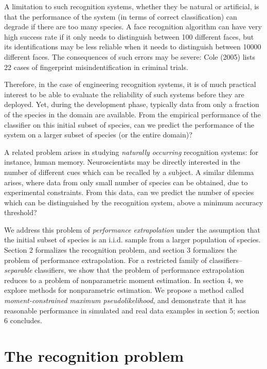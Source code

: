 \documentclass{article}
\begin{document}
A limitation to such recognition systems, whether they be natural or
artificial, is that the performance of the system (in terms of correct
classification) can degrade if there are too many species.  A face
recognition algorithm can have very high success rate if it only needs
to distinguish between 100 different faces, but its identifications
may be less reliable when it needs to distinguish between 10000
different faces.  The consequences of such errors may be severe: Cole
(2005) lists 22 cases of fingerprint misindentification in criminal
trials.

Therefore, in the case of engineering recognition systems, it is of
much practical interest to be able to evaluate the reliability of such
systems before they are deployed.  Yet, during the development phase,
typically data from only a fraction of the species in the domain are
available.  From the empirical performance of the classifier on this
initial subset of species, can we predict the performance of the
system on a larger subset of species (or the entire domain)?

A related problem arises in studying \emph{naturally occurring}
recognition systems: for instance, human memory.  Neuroscientists may
be directly interested in the number of different cues which can be
recalled by a subject.  A similar dilemma arises, where data from only
small number of species can be obtained, due to experimental
constraints.  From this data, can we predict the number of species
which can be distinguished by the recognition system, above a minimum
accuracy threshold?

We address this problem of \emph{performance extrapolation} under the
assumption that the initial subset of species is an i.i.d. sample from
a larger population of species.  Section 2 formalizes the recognition problem, and section 3
formalizes the problem of performance extrapolation.  For a restricted family of
classifiers--\emph{separable} classifiers, we show that the problem
of performance extrapolation reduces to a problem of nonparametric
moment estimation.  In section 4, we explore methods for nonparametric estimation.
We propose a method called \emph{moment-constrained maximum pseudolikelihood},
and demonstrate that it has reasonable performance in simulated and real data examples
in section 5;  section 6 concludes.


\section{The recognition problem}
\end{document}

